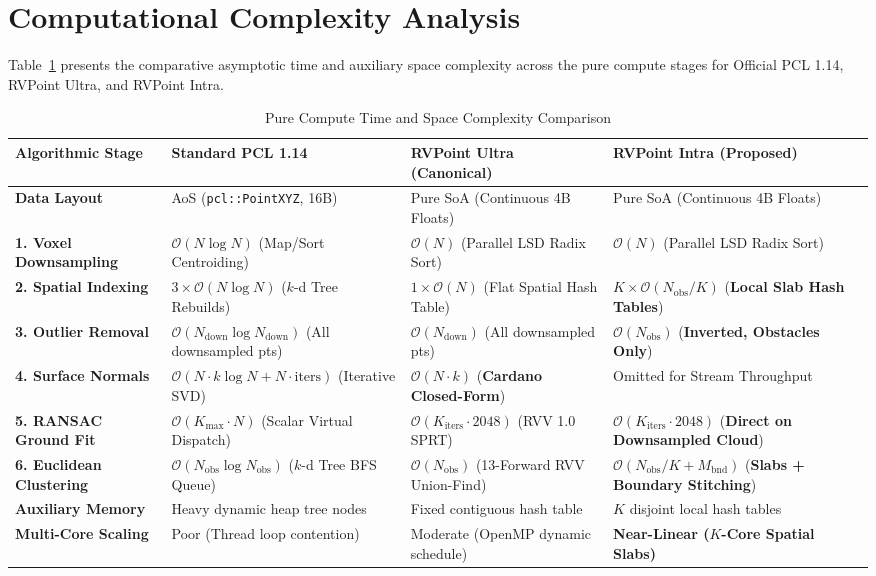 \documentclass[journal,compsoc]{IEEEtran}
\begin{document}
\section{Computational Complexity Analysis}
\label{sec:complexity}

Table~\ref{tab:complexity_matrix} presents the comparative asymptotic time and auxiliary space complexity across the pure compute stages for Official PCL 1.14, RVPoint Ultra, and RVPoint Intra.

\begin{table}[ht]
\centering
\caption{Pure Compute Time and Space Complexity Comparison}
\label{tab:complexity_matrix}
\begin{tabular}{@{}llll@{}}
\toprule
\textbf{Algorithmic Stage} & \textbf{Standard PCL 1.14} & \textbf{RVPoint Ultra (Canonical)} & \textbf{RVPoint Intra (Proposed)} \\ \midrule
\textbf{Data Layout} & AoS (\texttt{pcl::PointXYZ}, 16B) & Pure SoA (Continuous 4B Floats) & Pure SoA (Continuous 4B Floats) \\
\textbf{1. Voxel Downsampling} & $\mathcal{O}(N \log N)$ (Map/Sort Centroiding) & $\mathcal{O}(N)$ (Parallel LSD Radix Sort) & $\mathcal{O}(N)$ (Parallel LSD Radix Sort) \\
\textbf{2. Spatial Indexing} & $3 \times \mathcal{O}(N \log N)$ ($k$-d Tree Rebuilds) & $1 \times \mathcal{O}(N)$ (Flat Spatial Hash Table) & $K \times \mathcal{O}(N_{\text{obs}}/K)$ (\textbf{Local Slab Hash Tables}) \\
\textbf{3. Outlier Removal} & $\mathcal{O}(N_{\text{down}} \log N_{\text{down}})$ (All downsampled pts) & $\mathcal{O}(N_{\text{down}})$ (All downsampled pts) & $\mathcal{O}(N_{\text{obs}})$ (\textbf{Inverted, Obstacles Only}) \\
\textbf{4. Surface Normals} & $\mathcal{O}(N \cdot k \log N + N \cdot \text{iters})$ (Iterative SVD) & $\mathcal{O}(N \cdot k)$ (\textbf{Cardano Closed-Form}) & Omitted for Stream Throughput \\
\textbf{5. RANSAC Ground Fit} & $\mathcal{O}(K_{\max} \cdot N)$ (Scalar Virtual Dispatch) & $\mathcal{O}(K_{\text{iters}} \cdot 2048)$ (RVV 1.0 SPRT) & $\mathcal{O}(K_{\text{iters}} \cdot 2048)$ (\textbf{Direct on Downsampled Cloud}) \\
\textbf{6. Euclidean Clustering} & $\mathcal{O}(N_{\text{obs}} \log N_{\text{obs}})$ ($k$-d Tree BFS Queue) & $\mathcal{O}(N_{\text{obs}})$ (13-Forward RVV Union-Find) & $\mathcal{O}(N_{\text{obs}}/K + M_{\text{bnd}})$ (\textbf{Slabs + Boundary Stitching}) \\
\textbf{Auxiliary Memory} & Heavy dynamic heap tree nodes & Fixed contiguous hash table & $K$ disjoint local hash tables \\
\textbf{Multi-Core Scaling} & Poor (Thread loop contention) & Moderate (OpenMP dynamic schedule) & \textbf{Near-Linear ($K$-Core Spatial Slabs)} \\ \bottomrule
\end{tabular}
\end{table}
\end{document}
